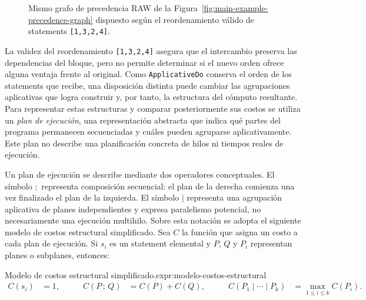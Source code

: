\begin{figure}[ht]
\centering
\begin{PrecedenceGraph}

\end{PrecedenceGraph}
\caption{Mismo grafo de precedencia RAW de la Figura~\ref{fig:main-example-precedence-graph} dispuesto según el reordenamiento válido de statements \texttt{[1,3,2,4]}.}
\label{fig:main-example-reordered-precedence-graph}
\end{figure}

La validez del reordenamiento \texttt{[1,3,2,4]} asegura que el intercambio preserva las dependencias del bloque, pero no permite determinar si el nuevo orden ofrece alguna ventaja frente al original. Como \texttt{ApplicativeDo} conserva el orden de los statements que recibe, una disposición distinta puede cambiar las agrupaciones aplicativas que logra construir y, por tanto, la estructura del cómputo resultante. Para representar estas estructuras y comparar posteriormente sus costos se utiliza un \textit{plan de ejecución}, una representación abstracta que indica qué partes del programa permanecen secuenciadas y cuáles pueden agruparse aplicativamente. Este plan no describe una planificación concreta de hilos ni tiempos reales de ejecución.

Un plan de ejecución se describe mediante dos operadores conceptuales. El símbolo $;$ representa composición secuencial: el plan de la derecha comienza una vez finalizado el plan de la izquierda. El símbolo $\mid$ representa una agrupación aplicativa de planes independientes y expresa paralelismo potencial, no necesariamente una ejecución multihilo. Sobre esta notación se adopta el siguiente modelo de costos estructural simplificado. Sea $C$ la función que asigna un costo a cada plan de ejecución. Si $s_i$ es un statement elemental y $P$, $Q$ y $P_i$ representan planes o subplanes, entonces:
\begin{samepage}

\begin{ReportExpression}{Modelo de costos estructural simplificado.}{expr:modelo-costos-estructural}
\[
\begin{aligned}
C(s_i) &= 1,
&\qquad C(P\,;\,Q) &= C(P)+C(Q),
&\qquad C(P_1\mid\cdots\mid P_k) &= \max_{1\leq i\leq k} C(P_i).
\end{aligned}
\]
\end{ReportExpression}
\end{samepage}

